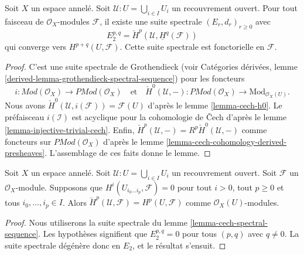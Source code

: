 \begin{lemma}

\label{lemma-cech-spectral-sequence}
Soit $X$ un espace annelé. Soit $\mathcal{U} : U = \bigcup_{i \in I} U_i$ un recouvrement ouvert. Pour tout faisceau de $\mathcal{O}_X$-modules $\mathcal{F}$, il existe une suite spectrale $(E_r, d_r)_{r \geq 0}$ avec $$
E_2^{p, q} = \check{H}^p(\mathcal{U}, \underline{H}^q(\mathcal{F}))
$$ qui converge vers $H^{p + q}(U, \mathcal{F})$. Cette suite spectrale est fonctorielle en $\mathcal{F}$.
\end{lemma}

\begin{proof}
C'est une suite spectrale de Grothendieck (voir Catégories dérivées, lemme \ref{derived-lemma-grothendieck-spectral-sequence}) pour les foncteurs $$
i :  \textit{Mod}(\mathcal{O}_X) \to \textit{PMod}(\mathcal{O}_X)
\quad\text{et}\quad
\check{H}^0(\mathcal{U}, - ) : \textit{PMod}(\mathcal{O}_X)
\to \text{Mod}_{\mathcal{O}_X(U)}.
$$ Nous avons $\check{H}^0(\mathcal{U}, i(\mathcal{F})) = \mathcal{F}(U)$ d'après le lemme \ref{lemma-cech-h0}. Le préfaisceau $i(\mathcal{I})$ est acyclique pour la cohomologie de {\v C}ech d'après le lemme \ref{lemma-injective-trivial-cech}. Enfin, $\check{H}^p(\mathcal{U}, -) = R^p\check{H}^0(\mathcal{U}, -)$ comme foncteurs sur $\textit{PMod}(\mathcal{O}_X)$ d'après le lemme \ref{lemma-cech-cohomology-derived-presheaves}. L'assemblage de ces faits donne le lemme.
\end{proof}

\begin{lemma}

\label{lemma-cech-spectral-sequence-application}
Soit $X$ un espace annelé. Soit $\mathcal{U} : U = \bigcup_{i \in I} U_i$ un recouvrement ouvert. Soit $\mathcal{F}$ un $\mathcal{O}_X$-module. Supposons que $H^i(U_{i_0 \ldots i_p}, \mathcal{F}) = 0$ pour tout $i > 0$, tout $p \geq 0$ et tous $i_0, \ldots, i_p \in I$. Alors $\check{H}^p(\mathcal{U}, \mathcal{F}) = H^p(U, \mathcal{F})$ comme $\mathcal{O}_X(U)$-modules.
\end{lemma}

\begin{proof}

Nous utiliserons la suite spectrale du lemme \ref{lemma-cech-spectral-sequence}. Les hypothèses signifient que $E_2^{p, q} = 0$ pour tous $(p, q)$ avec
$q \not = 0$. La suite spectrale dégénère donc en $E_2$,
et le résultat s'ensuit.

\end{proof}

